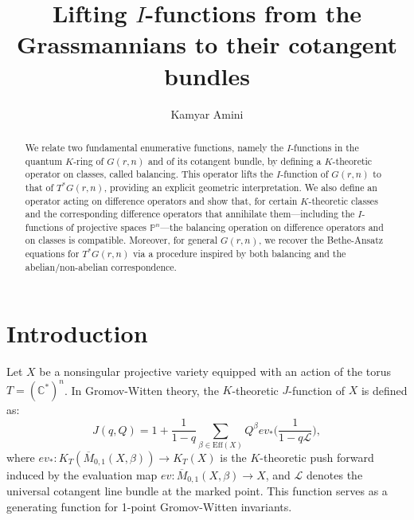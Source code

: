 \documentclass{amsart}
\begin{document}
\title[I-functions on cotangent bundles]{Lifting $I$-functions from the Grassmannians to their cotangent bundles}

\author{Kamyar Amini}
\address{
Department of Mathematics, 
225 Stanger Street, McBryde Hall,
Virginia Tech University, 
Blacksburg, VA 24061
USA
}


\begin{abstract} 
We relate two fundamental enumerative functions, namely the $I$-functions in the quantum $K$-ring of $G(r,n)$ and of its cotangent bundle, by defining a $K$-theoretic operator on classes, called balancing. This operator lifts the $I$-function of $G(r,n)$ to that of $T^*G(r,n)$, providing an explicit geometric interpretation. We also define an operator acting on difference operators and show that, for certain $K$-theoretic classes and the corresponding difference operators that annihilate them—including the $I$-functions of projective spaces $\mathbb{P}^n$—the balancing operation on difference operators and on classes is compatible. Moreover, for general $G(r,n)$, we recover the Bethe-Ansatz equations for $T^*G(r,n)$ via a procedure inspired by both balancing and the abelian/non-abelian correspondence.
\end{abstract}

\maketitle 

\setcounter{tocdepth}{1}
\tableofcontents






\section{Introduction}


Let $X$ be a nonsingular projective variety equipped with an action of the torus $T = (\mathbb{C}^*)^n$. In Gromov-Witten theory, the $K$-theoretic $J$-function of $X$ is defined as:
\[
J(q, Q) = 1+\frac{1}{1-q}\sum_{\beta \in \mathrm{Eff}(X)}Q^{\beta}ev_*\Big(\frac{1}{1-q\mathcal{L}}\Big),
\]
where $ev_*:K_T(\overline{M}_{0,1}(X,\beta)) \to K_T(X)$ is the $K$-theoretic push forward induced by the evaluation map $ev:\overline{M}_{0,1}(X,\beta) \to X$, and $\mathcal{L}$ denotes the universal cotangent line bundle at the marked point. This function serves as a generating function for 1-point Gromov-Witten invariants.
\end{document}
